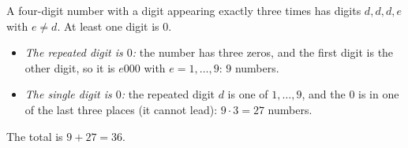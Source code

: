 A four-digit number with a digit appearing exactly three times has digits $d,d,d,e$ with $e\ne d$. At least one digit is $0$.
\begin{itemize}
\item \emph{The repeated digit is $0$:} the number has three zeros, and the first digit is the other digit, so it is $e000$ with $e=1,\dots,9$: $9$ numbers.
\item \emph{The single digit is $0$:} the repeated digit $d$ is one of $1,\dots,9$, and the $0$ is in one of the last three places (it cannot lead): $9\cdot3=27$ numbers.
\end{itemize}
The total is $9+27=\boxed{36}$.
